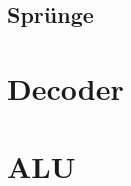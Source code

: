 \documentclass[paper=a4,fontsize=12pt]{scrreprt}
\begin{document}
\subsection{Sprünge}


\section{Decoder}



\section{ALU}
\end{document}
